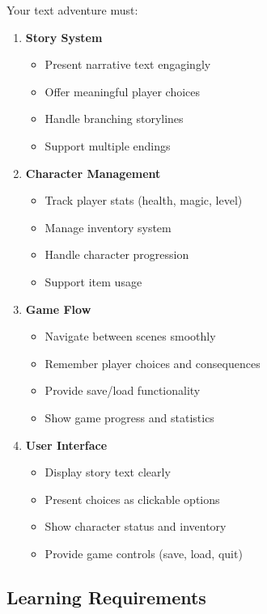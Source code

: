 \documentclass[
  letterpaper,
  DIV=11,
  numbers=noendperiod,
  oneside]{scrreprt}
\providecommand{\tightlist}{%
  \setlength{\itemsep}{0pt}\setlength{\parskip}{0pt}}\usepackage{longtable,booktabs,array}
\begin{document}
Your text adventure must:

\begin{enumerate}
\def\labelenumi{\arabic{enumi}.}
\tightlist
\item
  \textbf{Story System}

  \begin{itemize}
  \tightlist
  \item
    Present narrative text engagingly
  \item
    Offer meaningful player choices
  \item
    Handle branching storylines
  \item
    Support multiple endings
  \end{itemize}
\item
  \textbf{Character Management}

  \begin{itemize}
  \tightlist
  \item
    Track player stats (health, magic, level)
  \item
    Manage inventory system
  \item
    Handle character progression
  \item
    Support item usage
  \end{itemize}
\item
  \textbf{Game Flow}

  \begin{itemize}
  \tightlist
  \item
    Navigate between scenes smoothly
  \item
    Remember player choices and consequences
  \item
    Provide save/load functionality
  \item
    Show game progress and statistics
  \end{itemize}
\item
  \textbf{User Interface}

  \begin{itemize}
  \tightlist
  \item
    Display story text clearly
  \item
    Present choices as clickable options
  \item
    Show character status and inventory
  \item
    Provide game controls (save, load, quit)
  \end{itemize}
\end{enumerate}

\subsection{Learning Requirements}\label{learning-requirements-10}
\end{document}

